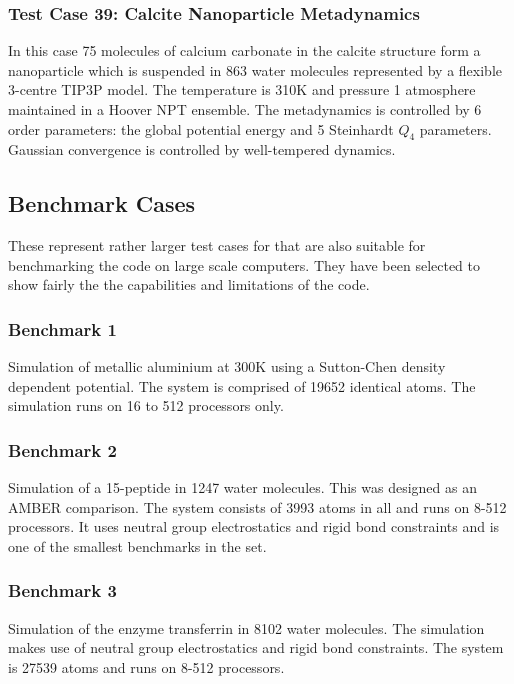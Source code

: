 \subsubsection{Test Case 39: Calcite Nanoparticle Metadynamics}
In this case 75 molecules of calcium carbonate in the calcite structure form a
nanoparticle which is suspended in 863 water molecules represented by a
flexible 3-centre TIP3P model. The temperature is 310K and pressure 1
atmosphere maintained in a Hoover NPT ensemble. The metadynamics is controlled
by 6 order parameters: the global potential energy and 5 Steinhardt $Q_{4}$
parameters. Gaussian convergence is controlled by well-tempered dynamics.

\subsection{Benchmark Cases}


These represent rather larger test cases for \D{} that are also suitable
for benchmarking the code on large scale computers. They have been
selected to show fairly the the capabilities and limitations of the
code.

\subsubsection{Benchmark 1}

Simulation of metallic aluminium at 300K using a Sutton-Chen density
dependent potential. The system is comprised of 19652 identical atoms.
The simulation runs on 16 to 512 processors only. 

\subsubsection{Benchmark 2}

Simulation of a 15-peptide in 1247 water molecules. This was designed
as an AMBER comparison. The system consists of 3993 atoms in all and
runs on 8-512 processors. It uses neutral group electrostatics and
rigid bond constraints and is one of the smallest benchmarks in the
set.

\subsubsection{Benchmark 3}

Simulation of the enzyme transferrin in 8102 water molecules. The
simulation makes use of neutral group electrostatics and rigid bond
constraints.  The system is 27539 atoms and runs on 8-512 processors.

